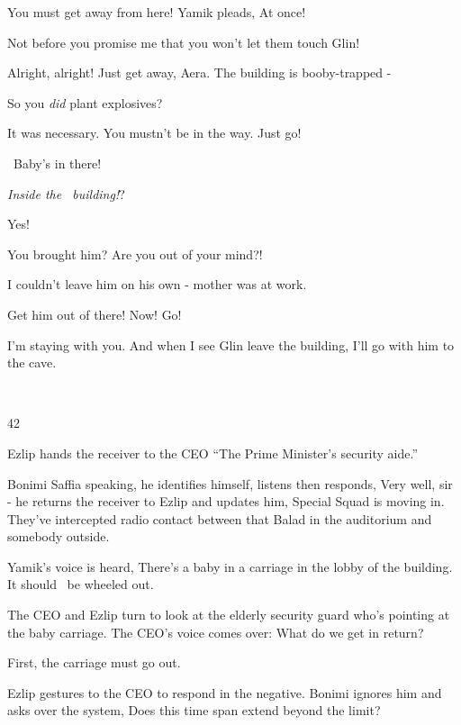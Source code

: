 \documentclass[12pt]{book}
\begin{document}
{\textquotedbl}You must get away from here!{\textquotedbl} Yamik pleads, {\textquotedbl}At
once!{\textquotedbl}~~~~~~~~~~~

{\textquotedbl}Not before you promise me that you won't let them touch Glin!{\textquotedbl}

{\textquotedbl}Alright, alright! Just get away, Aera{. T}he building is
booby-trapped -{\textquotedbl}

{\textquotedbl}So you \textit{did}{ }plant explosives?{\textquotedbl}

{\textquotedbl}{I}t was{ }necessary. You
mustn't be in the way. Just go!{\textquotedbl}

~{\textquotedbl}Baby's in there!{\textquotedbl}

{\textquotedbl}\textit{Inside the~ building!}?{\textquotedbl}

{\textquotedbl}Yes!{\textquotedbl}

{\textquotedbl}You brought him? Are you out of your mind?!{\textquotedbl}

{\textquotedbl}I couldn't leave him on his own {{}-} mother was at
work.{\textquotedbl}

{\textquotedbl}Get him out of there! Now! Go!{\textquotedbl}

{\textquotedbl}I'm staying with you. And when I see Glin leave the building, I'll go with him to the
cave.{\textquotedbl}

~

42

Ezlip hands the receiver to the CEO ``The Prime Minister's security aide.''

{\textquotedbl}Bonimi Saffia speaking,{\textquotedbl} he identifies himself, listens then responds, {\textquotedbl}Very
well, sir -{\textquotedbl} he returns the receiver to Ezlip and updates him, {\textquotedbl}Special Squad is moving in.
They've intercepted radio contact between that Balad in the auditorium and somebody outside.{\textquotedbl}

Yamik's voice is heard, {\textquotedbl}There's a baby in a carriage in the lobby of the building. It should \ be wheeled
out.{\textquotedbl}

The CEO and Ezlip turn to look at the elderly security{ }guard who's pointing at
the baby carriage. The CEO's voice comes over: {\textquotedbl}What do we get in return?{\textquotedbl}

{\textquotedbl}First, the carriage must go out.{\textquotedbl}

Ezlip gestures to the CEO to respond in the negative. Bonimi ignores him and asks over the system, {\textquotedbl}Does
this time span extend beyond the limit?{\textquotedbl}
\end{document}
